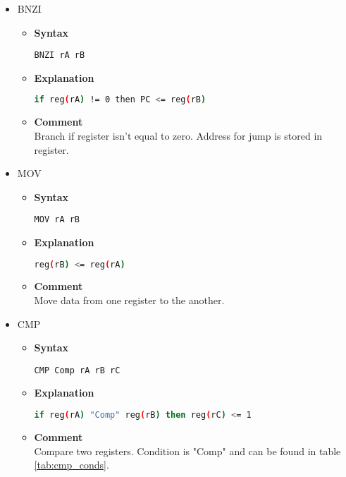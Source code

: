 \begin{itemize}
    \item BNZI
    \begin{itemize}
        \item \textbf{Syntax}
        \begin{lstlisting}[language={[x86masm]Assembler}, frame=single]
    BNZI rA rB
        \end{lstlisting}
        \item \textbf{Explanation}
        \begin{lstlisting}[language=bash, frame=single]
    if reg(rA) != 0 then PC <= reg(rB)
        \end{lstlisting}
        \item \textbf{Comment} \\
    Branch if register isn't equal to zero. Address for jump is stored in register.
    \end{itemize}

    \item MOV
    \begin{itemize}
        \item \textbf{Syntax}
        \begin{lstlisting}[language={[x86masm]Assembler}, frame=single]
    MOV rA rB
        \end{lstlisting}
        \item \textbf{Explanation}
        \begin{lstlisting}[language=bash, frame=single]
    reg(rB) <= reg(rA)
        \end{lstlisting}
        \item \textbf{Comment} \\
    Move data from one register to the another.
    \end{itemize}

    \item CMP
    \begin{itemize}
        \item \textbf{Syntax}
        \begin{lstlisting}[language={[x86masm]Assembler}, frame=single]
    CMP Comp rA rB rC
        \end{lstlisting}
        \item \textbf{Explanation}
        \begin{lstlisting}[language=bash, frame=single]
    if reg(rA) "Comp" reg(rB) then reg(rC) <= 1
        \end{lstlisting}
        \item \textbf{Comment} \\
    Compare two registers. Condition is "Comp" and can be found in table \ref{tab:cmp_conds}.


\end{itemize}
\end{itemize}
